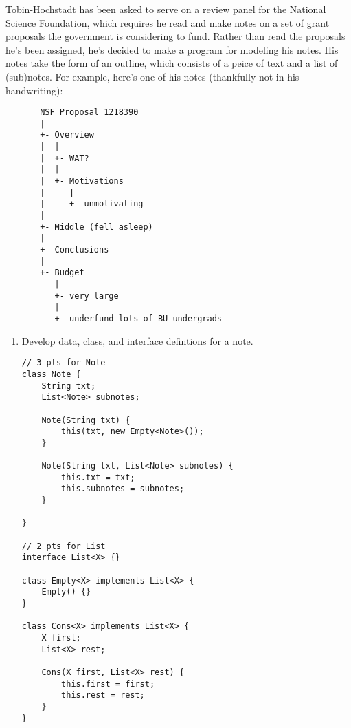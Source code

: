 \documentclass[12pt]{article}                   %
\def\pts#1{\marginpar{\footnotesize \raggedright  \fbox{#1 {\sc Points}}}}
\newenvironment{solution}{\color{Red}}{}
\begin{document}
\ifrubric
\else
{}
\fi
\newpage


\begin{problem} \pts{25}
\noindent
Tobin-Hochstadt has been asked to serve on a review panel for the
 National Science Foundation, which requires he read and make notes on
 a set of grant proposals the government is considering to fund.
  Rather than read the proposals he's been assigned, he's decided to
 make a program for modeling his notes.  His notes take the form of an
 outline, which consists of a peice of text and a list of (sub)notes.
  For example, here's one of his notes (thankfully not in his
 handwriting):
\begin{verbatim}
       NSF Proposal 1218390
       |
       +- Overview
       |  |
       |  +- WAT?
       |  |
       |  +- Motivations
       |     |
       |     +- unmotivating
       |
       +- Middle (fell asleep)
       |
       +- Conclusions
       |
       +- Budget
          |
          +- very large
          |
          +- underfund lots of BU undergrads
\end{verbatim}


\newpage

\begin{enumerate}

\item Develop data, class, and interface defintions for a note.

\begin{solution}
\begin{verbatim}
// 3 pts for Note
class Note {
    String txt;
    List<Note> subnotes;
    
    Note(String txt) {
        this(txt, new Empty<Note>());
    }

    Note(String txt, List<Note> subnotes) {
        this.txt = txt;
        this.subnotes = subnotes;
    }

}

// 2 pts for List
interface List<X> {}

class Empty<X> implements List<X> {
    Empty() {}
}

class Cons<X> implements List<X> {
    X first;
    List<X> rest;

    Cons(X first, List<X> rest) {
        this.first = first;
        this.rest = rest;
    }
}

\end{verbatim}
\end{solution}


\end{enumerate}
\end{problem}
\end{document}
